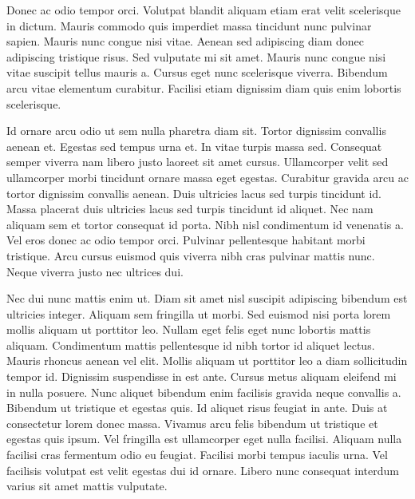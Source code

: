 \documentclass[a4]{report}
\begin{document}
Donec ac odio tempor orci. Volutpat blandit aliquam etiam erat velit scelerisque in dictum. Mauris commodo quis imperdiet massa tincidunt nunc pulvinar sapien. Mauris nunc congue nisi vitae. Aenean sed adipiscing diam donec adipiscing tristique risus. Sed vulputate mi sit amet. Mauris nunc congue nisi vitae suscipit tellus mauris a. Cursus eget nunc scelerisque viverra. Bibendum arcu vitae elementum curabitur. Facilisi etiam dignissim diam quis enim lobortis scelerisque.

Id ornare arcu odio ut sem nulla pharetra diam sit. Tortor dignissim convallis aenean et. Egestas sed tempus urna et. In vitae turpis massa sed. Consequat semper viverra nam libero justo laoreet sit amet cursus. Ullamcorper velit sed ullamcorper morbi tincidunt ornare massa eget egestas. Curabitur gravida arcu ac tortor dignissim convallis aenean. Duis ultricies lacus sed turpis tincidunt id. Massa placerat duis ultricies lacus sed turpis tincidunt id aliquet. Nec nam aliquam sem et tortor consequat id porta. Nibh nisl condimentum id venenatis a. Vel eros donec ac odio tempor orci. Pulvinar pellentesque habitant morbi tristique. Arcu cursus euismod quis viverra nibh cras pulvinar mattis nunc. Neque viverra justo nec ultrices dui.

Nec dui nunc mattis enim ut. Diam sit amet nisl suscipit adipiscing bibendum est ultricies integer. Aliquam sem fringilla ut morbi. Sed euismod nisi porta lorem mollis aliquam ut porttitor leo. Nullam eget felis eget nunc lobortis mattis aliquam. Condimentum mattis pellentesque id nibh tortor id aliquet lectus. Mauris rhoncus aenean vel elit. Mollis aliquam ut porttitor leo a diam sollicitudin tempor id. Dignissim suspendisse in est ante. Cursus metus aliquam eleifend mi in nulla posuere. Nunc aliquet bibendum enim facilisis gravida neque convallis a. Bibendum ut tristique et egestas quis. Id aliquet risus feugiat in ante. Duis at consectetur lorem donec massa. Vivamus arcu felis bibendum ut tristique et egestas quis ipsum. Vel fringilla est ullamcorper eget nulla facilisi. Aliquam nulla facilisi cras fermentum odio eu feugiat. Facilisi morbi tempus iaculis urna. Vel facilisis volutpat est velit egestas dui id ornare. Libero nunc consequat interdum varius sit amet mattis vulputate.
\end{document}
